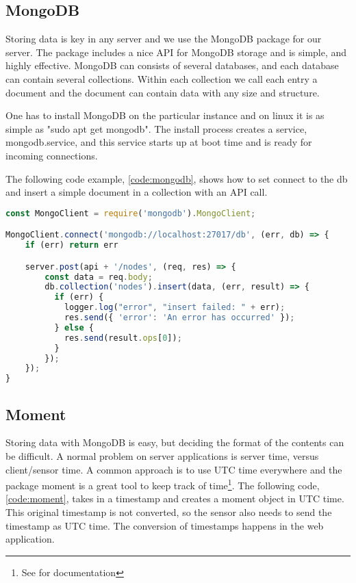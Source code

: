 \documentclass[USenglish]{ifimaster}  %
\begin{document}
\subsection{MongoDB} \label{subparagraph:mongodb}
Storing data is key in any server and we use the MongoDB package for our server. The package includes a nice API for MongoDB storage and is simple, and highly effective\cite{npm:mongodb}. MongoDB can consists of several databases, and each database can contain several collections. Within each collection we call each entry a document and the document can contain data with any size and structure.

One has to install MongoDB on the particular instance and on linux it is as simple as "sudo apt get mongodb". The install process creates a service, mongodb.service, and this service starts up at boot time and is ready for incoming connections.

The following code example, \vref{code:mongodb}, shows how to set connect to the db and insert a simple document in a collection with an API call.

\begin{lstlisting}[caption={MongoDB setup and insertion},label={code:mongodb},language=JavaScript]
const MongoClient = require('mongodb').MongoClient;

MongoClient.connect('mongodb://localhost:27017/db', (err, db) => {
    if (err) return err

    server.post(api + '/nodes', (req, res) => {
        const data = req.body;
        db.collection('nodes').insert(data, (err, result) => {
          if (err) {
            logger.log("error", "insert failed: " + err);
            res.send({ 'error': 'An error has occurred' });
          } else {
            res.send(result.ops[0]);
          }
        });
    });
}
\end{lstlisting}

\subsection{Moment}
Storing data with MongoDB is easy, but deciding the format of the contents can be difficult. A normal problem on server applications is server time, versus client/sensor time. A common approach is to use UTC time everywhere and the package moment is a great tool to keep track of time\footnote{See \cite{npm:moment} for documentation}. The following code, \vref{code:moment}, takes in a timestamp and creates a moment object in UTC time. This original timestamp is not converted, so the sensor also needs to send the timestamp as UTC time. The conversion of timestamps happens in the web application.
\end{document}
